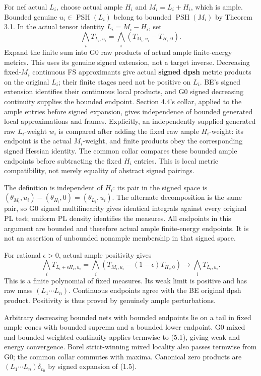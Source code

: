 \documentclass[
  10pt,
]{article}
\begin{document}
For nef actual \(L_i\), choose actual ample \(H_i\) and \(M_i=L_i+H_i\),
which is ample. Bounded genuine \(u_i\in\operatorname{PSH}(L_i)\) belong
to bounded \(\operatorname{PSH}(M_i)\) by Theorem 3.1. In the actual
tensor identity \(L_i=M_i-H_i\), set \[\bigwedge_i T_{L_i,u_i}
=\bigwedge_i(T_{M_i,u_i}-T_{H_i,0}). \tag{5.1}\] Expand the finite sum
into G0 raw products of actual ample finite-energy metrics. This uses
its genuine signed extension, not a target inverse. Decreasing
fixed-\(M_i\) continuous FS approximants give actual \textbf{signed
dpsh} metric products on the original \(L_i\); their finite stages need
not be positive on \(L_i\). BE's signed extension identifies their
continuous local products, and G0 signed decreasing continuity supplies
the bounded endpoint. Section 4.4's collar, applied to the ample entries
before signed expansion, gives independence of bounded generated local
approximations and frames. Explicitly, an independently supplied
generated raw \(L_i\)-weight \(w_i\) is compared after adding the fixed
raw ample \(H_i\)-weight: its endpoint is the actual \(M_i\)-weight, and
finite products obey the corresponding signed Hessian identity. The
common collar compares these bounded ample endpoints before subtracting
the fixed \(H_i\) entries. This is local metric compatibility, not
merely equality of abstract signed pairings.

The definition is independent of \(H_i\): its pair in the signed space
is \((\theta_{M_i},u_i)-(\theta_{H_i},0)=(\theta_{L_i},u_i)\). The
alternate decomposition is the same pair, so G0 signed multilinearity
gives identical integrals against every original PL test; uniform PL
density identifies the measures. All endpoints in this argument are
bounded and therefore actual ample finite-energy endpoints. It is not an
assertion of unbounded nonample membership in that signed space.

For rational \(\epsilon>0\), actual ample positivity gives
\[\bigwedge_i T_{L_i+\epsilon H_i,u_i}
=\bigwedge_i(T_{M_i,u_i}-(1-\epsilon)T_{H_i,0})
\longrightarrow\bigwedge_i T_{L_i,u_i}. \tag{5.2}\] This is a finite
polynomial of fixed measures. Its weak limit is positive and has raw
mass \((L_1\cdots L_n)\). Continuous endpoints agree with the BE
original dpsh product. Positivity is thus proved by genuinely ample
perturbations.

Arbitrary decreasing bounded nets with bounded endpoints lie on a tail
in fixed ample cones with bounded suprema and a bounded lower endpoint.
G0 mixed and bounded weighted continuity applies termwise to (5.1),
giving weak and energy convergence. Borel strict-winning mixed locality
also passes termwise from G0; the common collar commutes with maxima.
Canonical zero products are \((L_1\cdots L_n)\delta_{v_0}\) by signed
expansion of (1.5).
\end{document}
